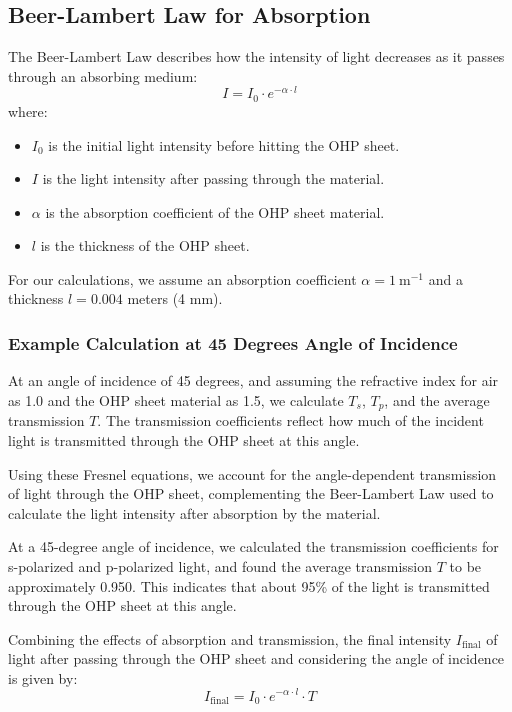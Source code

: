 \subsection{Beer-Lambert Law for Absorption} \label{sec:absorption}
The Beer-Lambert Law \citep{eschede2017optics} describes how the intensity of light decreases as it passes through an absorbing medium:
\[ I = I_0 \cdot e^{-\alpha \cdot l} \]
where:
\begin{itemize}
    \item \(I_0\) is the initial light intensity before hitting the OHP sheet.
    \item \(I\) is the light intensity after passing through the material.
    \item \(\alpha\) is the absorption coefficient of the OHP sheet material.
    \item \(l\) is the thickness of the OHP sheet.
\end{itemize}

For our calculations, we assume an absorption coefficient \(\alpha = 1\ \text{m}^{-1}\) and a thickness \(l = 0.004\) meters (4 mm).

\subsubsection*{Example Calculation at 45 Degrees Angle of Incidence}
At an angle of incidence of 45 degrees, and assuming the refractive index for air as 1.0 and the OHP sheet material as 1.5, we calculate \( T_s \), \( T_p \), and the average transmission \( T \). The transmission coefficients reflect how much of the incident light is transmitted through the OHP sheet at this angle.

Using these Fresnel equations, we account for the angle-dependent transmission of light through the OHP sheet, complementing the Beer-Lambert Law used to calculate the light intensity after absorption by the material.

At a 45-degree angle of incidence, we calculated the transmission coefficients for s-polarized and p-polarized light, and found the average transmission \(T\) to be approximately 0.950. This indicates that about 95\% of the light is transmitted through the OHP sheet at this angle.

Combining the effects of absorption and transmission, the final intensity \(I_{\text{final}}\) of light after passing through the OHP sheet and considering the angle of incidence is given by:
\[ I_{\text{final}} = I_0 \cdot e^{-\alpha \cdot l} \cdot T \]

